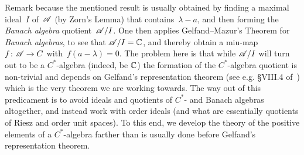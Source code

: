 \documentclass[a]{subfiles}
\begin{document}
\begin{parsec}
\begin{point}{Remark}
because the mentioned result is usually obtained
by finding a maximal ideal~$I$ of~$\mathscr{A}$
(by Zorn's Lemma) that contains~$\lambda-a$,
and then forming the \emph{Banach algebra} quotient~$\mathscr{A}/I$.
One then applies Gelfand--Mazur's Theorem for \emph{Banach algebras}, 
to see that
$\mathscr{A}/I= \mathbb{C}$,
and thereby obtain a miu-map~$f\colon \mathscr{A}\to C$ with~$f(a-\lambda)=0$.
The problem here is that while $\mathscr{A}/I$
will turn out to be a $C^*$-algebra (indeed, be $\mathbb{C}$)
the formation of the $C^*$-algebra quotient
is non-trivial and depends on Gelfand's representation theorem
(see e.g. \S{}VIII.4 of~\cite{conway2013}) 
which is the very theorem we are working towards.
The way out of this predicament
is to avoid ideals and quotients of $C^*$- and Banach algebras
altogether,
and instead work 
with order ideals (and what are essentially
 quotients of Riesz and order unit spaces).
To this end,
we develop the theory
of the positive elements of a $C^*$-algebra
farther than is usually done
before Gelfand's representation theorem.
\end{point}
\end{parsec}
\end{document}
